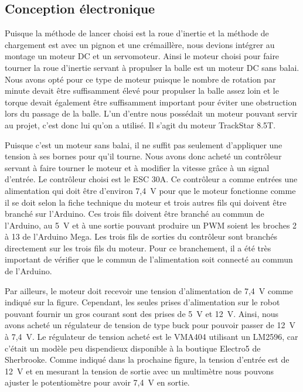 
\subsection{Conception électronique}

Puisque la méthode de lancer choisi est la roue d’inertie et la méthode de chargement est avec un pignon et une crémaillère, nous devions intégrer au montage un moteur DC et un servomoteur.
Ainsi le moteur choisi pour faire tourner la roue d’inertie servant à propulser la balle est un moteur DC sans balai.
Nous avons opté pour ce type de moteur puisque le nombre de rotation par minute devait être suffisamment élevé pour propulser la balle assez loin et le torque devait également être suffisamment important pour éviter une obstruction lors du passage de la balle.
L’un d’entre nous possédait un moteur pouvant servir au projet, c’est donc lui qu’on a utilisé.
Il s’agit du moteur TrackStar 8.5T.


Puisque c’est un moteur sans balai, il ne suffit pas seulement d’appliquer une tension à ses bornes pour qu’il tourne.
Nous avons donc acheté un contrôleur servant à faire tourner le moteur et à modifier la vitesse grâce à un signal d'entrée.
Le contrôleur choisi est le ESC 30A.
Ce contrôleur a comme entrées une alimentation qui doit être d’environ 7,4~V pour que le moteur fonctionne comme il se doit selon la fiche technique du moteur \cite{noauthor_trackstar_nodate} et trois autres fils qui doivent être branché sur l’Arduino.
Ces trois fils doivent être branché au commun de l’Arduino, au 5~V et à une sortie pouvant produire un PWM soient les broches 2 à 13 de l’Arduino Mega.
Les trois fils de sorties du contrôleur sont branchés directement sur les trois fils du moteur.
Pour ce branchement, il a été très important de vérifier que le commun de l’alimentation soit connecté au commun de l’Arduino.


Par ailleurs, le moteur doit recevoir une tension d’alimentation de 7,4~V comme indiqué sur la figure.
Cependant, les seules prises d’alimentation sur le robot pouvant fournir un gros courant sont des prises de 5~V et 12~V.
Ainsi, nous avons acheté un régulateur de tension de type buck pour pouvoir passer de 12~V à 7,4~V.
Le régulateur de tension acheté est le VMA404 utilisant un LM2596, car c’était un modèle peu dispendieux disponible à la boutique Electro5 de Sherbrooke.
Comme indiqué dans la prochaine figure, la tension d’entrée est de 12~V et en mesurant la tension de sortie avec un multimètre nous pouvons ajuster le potentiomètre pour avoir 7,4~V en sortie.

